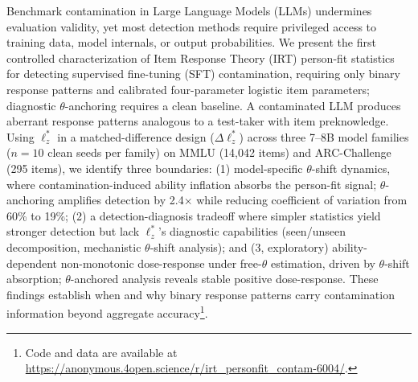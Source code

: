 Benchmark contamination in Large Language Models (LLMs) undermines evaluation validity, yet most detection methods require privileged access to training data, model internals, or output probabilities.
We present the first controlled characterization of Item Response Theory (IRT) person-fit statistics for detecting supervised fine-tuning (SFT) contamination, requiring only binary response patterns and calibrated four-parameter logistic item parameters; diagnostic $\theta$-anchoring requires a clean baseline.
A contaminated LLM produces aberrant response patterns analogous to a test-taker with item preknowledge.
Using $\ell_z^*$ in a matched-difference design ($\Delta\ell_z^*$) across three 7--8B model families ($n{=}10$ clean seeds per family) on MMLU (14,042 items) and ARC-Challenge (295 items), we identify three boundaries:
(1) model-specific $\theta$-shift dynamics, where contamination-induced ability inflation absorbs the person-fit signal; $\theta$-anchoring amplifies detection by 2.4$\times$ while reducing coefficient of variation from 60\% to 19\%;
(2) a detection-diagnosis tradeoff where simpler statistics yield stronger detection but lack $\ell_z^*$'s diagnostic capabilities (seen/unseen decomposition, mechanistic $\theta$-shift analysis);
and (3, exploratory) ability-dependent non-monotonic dose-response under free-$\theta$ estimation, driven by $\theta$-shift absorption; $\theta$-anchored analysis reveals stable positive dose-response.
These findings establish when and why binary response patterns carry contamination information beyond aggregate accuracy\footnote{Code and data are available at \url{https://anonymous.4open.science/r/irt_personfit_contam-6004/}.}.
